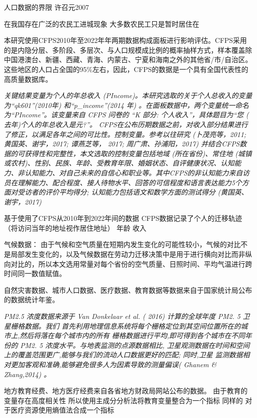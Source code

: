 \documentclass[a4paper,12pt,oneside]{book} %
\begin{document}
人口数据的界限
许召元2007

在我国存在广泛的农民工进城现象 大多数农民工只是暂时居住在


本研究使用CFPS2010年至2022年年两期数据构成面板进行影响评估。CFPS采用的是内隐分层、多阶段、多层次、与人口规模成比例的概率抽样方式，样本覆盖除中国港澳台、新疆、西藏、青海、内蒙古、宁夏和海南之外的其他省/市/自治区。这些地区的人口占全国的95\%左右，因此，CFPS的数据是一个具有全国代表性的高质量数据库。

\textit{关键结果变量为个人的年总收入 (PIncome)。本研究选取的关于个人总收入的变量为“qk601”(2010年) 和“p\_income”(2014 年) 。在面板数据中，两个变量统一命名为“PIncome”。该变量来自 CFPS 问卷的 “K 部分: 个人收入”，具体题目为“您 ( 去年)个人的年总收入是元?”。
CFPS在公布历期数据之前，对收入部分结果进行了修正，以满足各年之间的可比性。控制变量。参考以往研究 (卜茂亮等，2011; 黄国英、谢宇，2017; 谭燕芝等， 2017; 周广肃、孙浦阳，2017) 并结合CFPS数据的可获得性和完整性，本文选取的控制变量包括地域 (所在省份)、常住地 (城镇或农村)、性别、民族、年龄、受教育年限、婚姻状态、自评健康状况、认知能力、非认知能力、对自己未来的自信心和职业等。其中CFPS的非认知能力来自访员在理解能力、配合程度、接人待物水平、回答的可信程度和语言表达能力5个方面对受访者的评价平均得分; 认知能力包括语文和数学方面的测试得分 (黄国英、谢宇，2017)}


基于使用了CFPS从2010年到2022年间的数据
CFPS数据记录了个人的迁移轨迹（将访问当年的地址视作居住地址）
年龄
收入


气候数据：
由于气候和空气质量在短期内发生变化的可能性较小，气候的对比不是局部发生变化的，以及气候数据在劳动力迁移决策中是用于进行横向对比而非纵向对比的，所以本文选用常量对每个省份的空气质量、日照时间、平均气温进行跨时间同一数值赋值。


自然灾害数据、城市人口数据、医疗数据、教育数据等数据来自于国家统计局公布的数据统计年鉴。

\textit{PM2.5 浓度数据来源于 Van Donkelaar et al. ( 2016) 计算的全球年度 PM2. 5 卫星栅格数据。我们 首先利用地理信息系统将每个栅格定位到其空间位置所在的城市上,然后将落在每个城市内的所有 栅格数据进行平均,即可得到各个城市在不同年份的 PM2. 5 浓度水平。与地表监测的点源数据相比, 卫星观测数据在时间和空间上的覆盖范围更广,能够与我们的流动人口数据更好的匹配; 同时,卫星 监测数据相对更加客观和准确,能够避免很多人为因素导致的测量偏误( Ghanem \& Zhang,2014) 。}


地方教育经费、地方医疗经费来自各省地方财政局网站公布的数据。
由于教育的变量存在高度相关性
所以使用主成分分析法将教育变量整合为一个指标
同样的
对于医疗资源使用熵值法合成一个指标
\end{document}
